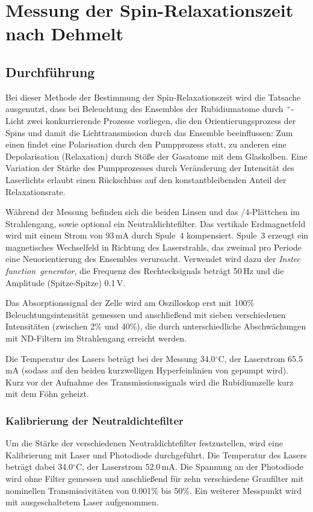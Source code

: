 \section{Messung der Spin-Relaxationszeit nach Dehmelt}
\label{sect:dehmelt}
\subsection{Durchführung}
Bei dieser Methode der Bestimmung der Spin-Relaxationszeit wird die Tatsache ausgenutzt,
dass bei Beleuchtung des Ensembles der Rubidiumatome durch \textsigma$^+$-Licht
zwei konkurrierende Prozesse vorliegen, die den Orientierungsprozess der Spins und damit
die Lichttransmission durch das Ensemble beeinflussen:
Zum einen findet eine Polarisation durch den Pumpprozess statt,
zu anderen eine Depolarisation (Relaxation) durch Stöße der Gasatome mit dem Glaskolben.
Eine Variation der Stärke des Pumpprozesses durch Veränderung der Intensität des Laserlichts
erlaubt einen Rückschluss auf den konstantbleibenden Anteil der Relaxationsrate.

Während der Messung befinden sich die beiden Linsen und das \textlambda/4-Plättchen im Strahlengang,
sowie optional ein Neutraldichtefilter.
Das vertikale Erdmagnetfeld wird mit einem Strom von 93\,mA durch Spule~4 kompensiert.
Spule~3 erzeugt ein magnetisches Wechselfeld in Richtung des Laserstrahls,
das zweimal pro Periode eine Neuorientierung des Ensembles verursacht.
Verwendet wird dazu der \emph{Instec function~generator},
die Frequenz des Rechtecksignals beträgt 50\,Hz und die Amplitude (Spitze-Spitze) 0.1\,V.

Das Absorptionssignal der Zelle wird am Oszilloskop erst mit 100\% Beleuchtungsintensität gemessen
und anschließend mit sieben verschiedenen Intensitäten (zwischen 2\% und 40\%),
die durch unterschiedliche Abschwächungen mit ND-Filtern im Strahlengang erreicht werden.

Die Temperatur des Lasers beträgt bei der Messung 34.0$^\circ$C, der Laserstrom 65.5\,mA
(sodass auf den beiden kurzwelligen Hyperfeinlinien von  gepumpt wird).
Kurz vor der Aufnahme des Transmissionssignals wird die Rubidiumzelle kurz mit dem Föhn geheizt.






\subsubsection*{Kalibrierung der Neutraldichtefilter}
Um die Stärke der verschiedenen Neutraldichtefilter festzustellen,
wird eine Kalibrierung mit Laser und Photodiode durchgeführt.
Die Temperatur des Lasers beträgt dabei 34.0$^\circ$C, der Laserstrom 52.0\,mA.
Die Spannung an der Photodiode wird ohne Filter gemessen und anschließend für zehn verschiedene Graufilter
mit nominellen Transmissivitäten von 0.001\% bis 50\%.
Ein weiterer Messpunkt wird mit ausgeschaltetem Laser aufgenommen.


